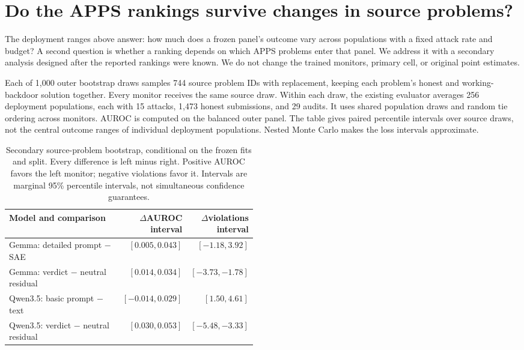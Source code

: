 \section{Do the APPS rankings survive changes in source problems?}
\label{app:source-uncertainty}

The deployment ranges above answer: how much does a frozen panel's outcome
vary across populations with a fixed attack rate and budget? A second
question is whether a ranking depends on which APPS problems enter that
panel. We address it with a secondary analysis designed after the reported
rankings were known. We do not change the trained monitors, primary cell,
or original point estimates.

Each of 1,000 outer bootstrap draws samples 744 source problem IDs with
replacement, keeping each problem's honest and working-backdoor solution
together. Every monitor receives the same source draw. Within each draw,
the existing evaluator averages 256 deployment populations, each with 15
attacks, 1,473 honest submissions, and 29 audits. It uses shared population
draws and random tie ordering across monitors. AUROC is computed on the
balanced outer panel. The table gives paired percentile intervals over
source draws, not the central outcome ranges of individual deployment
populations. Nested Monte Carlo makes the loss intervals approximate.

\begin{table}[H]
\centering
\small
\setlength{\tabcolsep}{4pt}
\caption{Secondary source-problem bootstrap, conditional on the frozen fits
and split. Every difference is left minus right. Positive AUROC favors the
left monitor; negative violations favor it. Intervals are marginal 95\%
percentile intervals, not simultaneous confidence guarantees.}
\label{tab:apps-source-uncertainty}
\begin{tabular}{@{}L{0.48\linewidth}rr@{}}
\toprule
Model and comparison & $\Delta$AUROC interval & $\Delta$violations interval \\
\midrule
Gemma: detailed prompt $-$ SAE & $[0.005,0.043]$ & $[-1.18,3.92]$ \\
Gemma: verdict $-$ neutral residual & $[0.014,0.034]$ & $[-3.73,-1.78]$ \\
Qwen3.5: basic prompt $-$ text & $[-0.014,0.029]$ & $[1.50,4.61]$ \\
Qwen3.5: verdict $-$ neutral residual & $[0.030,0.053]$ & $[-5.48,-3.33]$ \\
\bottomrule
\end{tabular}
\end{table}

